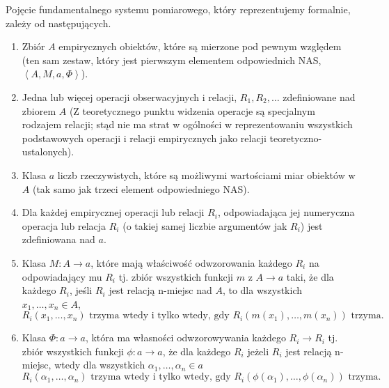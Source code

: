 \documentclass[12pt,a4paper]{report}
\newcommand{\tuple}[1]{\left\langle {#1} \right\rangle}
\begin{document}
Pojęcie fundamentalnego systemu pomiarowego, który reprezentujemy formalnie, zależy od następujących.
\begin{enumerate}
\item
Zbiór $A$ empirycznych obiektów, które są mierzone pod pewnym względem (ten sam zestaw, który jest pierwszym elementem odpowiednich NAS, $\tuple{A,M,a,\Phi}$).
\item
Jedna lub więcej operacji obserwacyjnych i relacji, $R_{1},R_{2},\dots$ zdefiniowane nad zbiorem $A$ (Z teoretycznego punktu widzenia operacje są
specjalnym rodzajem relacji; stąd nie ma strat w ogólności w reprezentowaniu wszystkich podstawowych operacji i relacji empirycznych jako relacji teoretyczno-ustalonych).
\item
Klasa $a$ liczb rzeczywistych, które są możliwymi wartościami miar obiektów w $A$ (tak samo jak trzeci element odpowiedniego NAS).
\item
Dla każdej empirycznej operacji lub relacji $R_{i}$, odpowiadająca jej numeryczna operacja lub relacja $R_{i}$ (o takiej samej liczbie argumentów jak $R_{i}$) jest zdefiniowana nad $a$.
\item
Klasa $M:A\to a$, które mają właściwość odwzorowania każdego $R_{i}$ na odpowiadający mu $R_{i}$ tj. zbiór wszystkich funkcji $m$ z $A\to a$ taki, że dla każdego $R_{i}$, jeśli $R_{i}$ jest relacją n-miejsc nad $A$, to dla wszystkich $x_{1},\dots, x_{n} \in A$,
\begin{equation*}
R_{i}(x_{1},\dots,x_{n}) \textrm{ trzyma wtedy i tylko wtedy, gdy } R_{i}(m(x_{1}),\dots,m(x_{n})) \textrm{ trzyma}.
\end{equation*}
\item
Klasa $\Phi:a\to a$, która ma własności odwzorowywania każdego $R_{i} \to R_{i}$ tj. zbiór wszystkich funkcji $\phi: a \to a$, że dla każdego $R_{i}$ jeżeli $R_{i}$ jest relacją n-miejsc, wtedy dla wszystkich $\alpha_{1},\dots,\alpha_{n}\in a$
\begin{equation*}
R_{i}(\alpha_{1},\dots,\alpha_{n}) \textrm{ trzyma wtedy i tylko wtedy, gdy } R_{i}(\phi(\alpha_{1}),\dots,\phi(\alpha_{n})) \textrm{ trzyma}.
\end{equation*} 
\end{enumerate}
\end{document}
